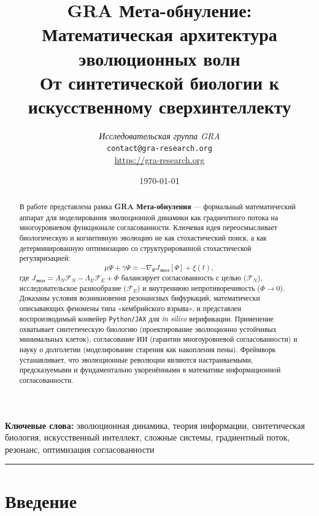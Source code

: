 \documentclass[11pt,a4paper]{article}
\title{
    \vspace{-2em}
    GRA Мета-обнуление: \\
    Математическая архитектура эволюционных волн \\
    \large От синтетической биологии к искусственному сверхинтеллекту
}
\author{
    \textit{Исследовательская группа GRA} \\
    \small \texttt{contact@gra-research.org} \\
    \small \url{https://gra-research.org}
}
\date{\today}
\theoremstyle{plain}
\theoremstyle{definition}
\theoremstyle{remark}
\newcommand{\grad}{\nabla}
\begin{document}
\maketitle
\thispagestyle{empty}

\begin{abstract}
\noindent
В работе представлена рамка \textbf{GRA Мета-обнуления} --- формальный математический аппарат для моделирования эволюционной динамики как градиентного потока на многоуровневом функционале согласованности. Ключевая идея переосмысливает биологическую и когнитивную эволюцию не как стохастический поиск, а как детерминированную оптимизацию со структурированной стохастической регуляризацией:
\[
\mu \ddot{\Psi} + \gamma \dot{\Psi} = -\grad_{\Psi} J_{\text{эвол}}[\Psi] + \xi(t),
\]
где $J_{\text{эвол}} = \Lambda_N \mathcal{F}_N - \Lambda_E \mathcal{F}_E + \Phi$ балансирует согласованность с целью ($\mathcal{F}_N$), исследовательское разнообразие ($\mathcal{F}_E$) и внутреннюю непротиворечивость ($\Phi \to 0$). Доказаны условия возникновения резонансных бифуркаций, математически описывающих феномены типа «кембрийского взрыва», и представлен воспроизводимый конвейер \texttt{Python/JAX} для \textit{in silico} верификации. Применение охватывает синтетическую биологию (проектирование эволюционно устойчивых минимальных клеток), согласование ИИ (гарантии многоуровневой согласованности) и науку о долголетии (моделирование старения как накопления пены). Фреймворк устанавливает, что эволюционные революции являются настраиваемыми, предсказуемыми и фундаментально укоренёнными в математике информационной согласованности.
\end{abstract}

\textbf{Ключевые слова:} эволюционная динамика, теория информации, синтетическая биология, искусственный интеллект, сложные системы, градиентный поток, резонанс, оптимизация согласованности

\vspace{1em}
\hrule
\vspace{2em}

\tableofcontents
\vspace{2em}

\section{Введение}
\end{document}
